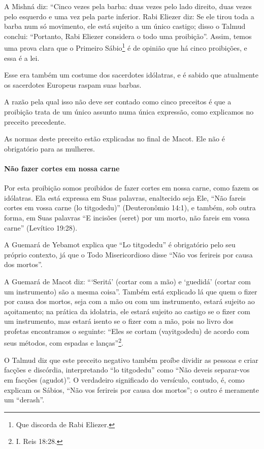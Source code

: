 A Mishná diz: ``Cinco vezes pela barba: duas vezes pelo lado direito,
duas vezes pelo esquerdo e uma vez pela parte inferior. Rabi Eliezer
diz: Se ele tirou toda a barba num só movimento, ele está sujeito a um
único castigo; disso o Talmud conclui: ``Portanto, Rabi Eliezer
considera o todo uma proibição''. Assim, temos uma prova clara que o
Primeiro Sábio\footnote{Que discorda de Rabi Eliezer.} é de opinião que há cinco
proibições, e essa é a lei.

Esse era também um costume dos sacerdotes idólatras, e é sabido que
atualmente os sacerdotes Europeus raspam suas barbas.

A razão pela qual isso não deve ser contado como cinco preceitos é que a
proibição trata de um único assunto numa única expressão, como
explicamos no preceito precedente.

As normas deste preceito estão explicadas no final de Macot. Ele não é
obrigatório para as mulheres.

\paragraph{Não fazer cortes em nossa carne}

Por esta proibição somos proibidos de fazer cortes em nossa carne, como
fazem os idólatras. Ela está expressa em Suas palavras, enaltecido seja
Ele, ``Não fareis cortes em vossa carne (lo titgodedu)'' (Deuteronômio
14:1), e também, sob outra forma, em Suas palavras ``E incisões (seret)
por um morto, não fareis em vossa carne'' (Levítico 19:28).

A Guemará de Yebamot explica que ``Lo titgodedu'' é obrigatório
pelo seu próprio contexto, já que o Todo Misericordioso disse ``Não vos
ferireis por causa dos mortos''.

A Guemará de Macot diz: ```Seritá' (cortar com a mão) e `guedidá'
(cortar com um instrumento) são a mesma coisa''. Também está explicado
lá que quem o fizer por causa dos mortos, seja com a mão ou com um
instrumento, estará sujeito ao açoitamento; na prática da idolatria,
ele estará sujeito ao castigo se o fizer com um instrumento, mas estará
isento se o fizer com a mão, pois no livro dos profetas encontramos o
seguinte: ``Eles se cortam (vayitgodedu) de acordo com seus métodos,
com espadas e lanças''\footnote{I. Reis 18:28.}.

O Talmud diz que este preceito negativo também proíbe dividir as pessoas
e criar facções e discórdia, interpretando ``lo titgodedu'' como ``Não
deveis separar-vos em facções (agudot)''. O verdadeiro significado do
versículo, contudo, é, como explicam os Sábios, ``Não vos ferireis por
causa dos mortos''; o outro é meramente um ``derash''.

